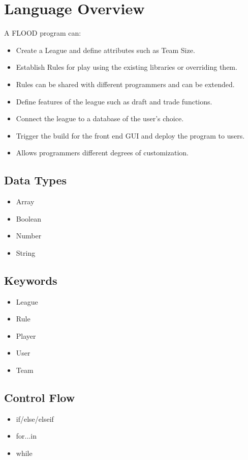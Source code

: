 \documentclass[12pt]{article}
\begin{document}
\section{Language Overview}
A FLOOD program can:
\begin{itemize}
\setlength{\itemsep}{1pt}
\item Create a League and define attributes such as Team Size.
\item Establish Rules for play using the existing libraries or overriding them.
\item Rules can be shared with different programmers and can be extended.
\item Define features of the league such as draft and trade functions.
\item Connect the league to a database of the user's choice.
\item Trigger the build for the front end GUI and deploy the program to users.
\item Allows programmers different degrees of customization.
\end{itemize}

\subsection{Data Types}
\begin{itemize}
\setlength{\itemsep}{1pt}
\item Array
\item Boolean
\item Number
\item String
\end{itemize}

\subsection{Keywords}
\begin{itemize}
\setlength{\itemsep}{1pt}
\item League
\item Rule
\item Player
\item User
\item Team
\end{itemize}

\subsection{Control Flow}
\begin{itemize}
\setlength{\itemsep}{1pt}
\item if/else/elseif
\item for...in
\item while
\end{itemize}
\end{document}

